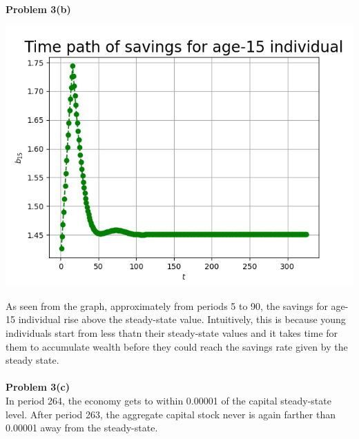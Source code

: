 \documentclass[letterpaper,12pt]{article}
\theoremstyle{definition}
\begin{document}
\\
\noindent\textbf{Problem 3(b)}\\
\begin{center}
\includegraphics[scale=0.7]{bplot}
\end{center}
As seen from the graph, approximately from periods 5 to 90, the savings for age-15 individual rise above the steady-state value. Intuitively, this is because young individuals start from less thatn their steady-state values and it takes time for them to accumulate wealth before they could reach the savings rate given by the steady state.\\
\\
\noindent\textbf{Problem 3(c)}\\
In period 264, the economy gets to within 0.00001 of the capital steady-state level. After period 263, the aggregate capital stock never is again farther than 0.00001 away from
the steady-state.
\end{document}
